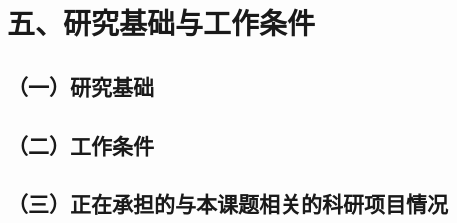 \documentclass[12pt]{article}
\begin{document}
\section{五、研究基础与工作条件}
\subsection{（一）研究基础}

\subsection{（二）工作条件}

\subsection{（三）正在承担的与本课题相关的科研项目情况}
\end{document}
